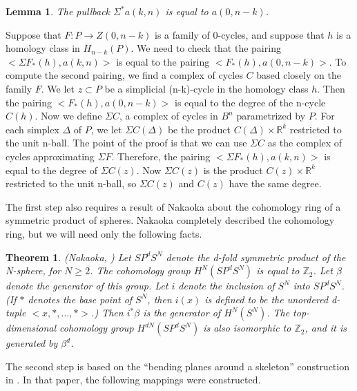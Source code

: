 \documentclass{amsart}
\newtheorem*{reftheorem}{Theorem}
\newtheorem*{Theorem 1}{Theorem 1}
\newtheorem*{Theorem 2}{Theorem 2}
\newtheorem*{Theorem 1A}{Theorem 1A}
\newtheorem*{Theorem 2A}{Theorem 2A}
\newtheorem{lemma}{Lemma}[section]
\newtheorem*{vanishing lemma}{Vanishing Lemma}
\numberwithin{equation}{section}
\begin{document}
\begin{lemma} The pullback $\Sigma^* a(k,n)$ is equal to $a(0,n-k)$.
\end{lemma}

\proof Suppose that $F: P \rightarrow Z(0,n-k)$ is a family of 0-cycles, and
suppose that $h$ is a homology class in $H_{n-k}(P)$.  We
need to check that the pairing $<\Sigma F_*(h), a(k,n)>$ is equal to the pairing
$<F_*(h), a(0,n-k)>$.  To compute
the second pairing, we find a complex of cycles $C$ based closely on the family
$F$.  We let $z \subset P$ be a simplicial (n-k)-cycle in the homology class $h$.  Then
the pairing $<F_*(h), a(0,n-k)>$ is equal to the degree of the n-cycle $C(h)$.
Now we define $\Sigma C$, a complex of cycles in $B^n$ parametrized by $P$.  For each
simplex $\Delta$ of $P$, we let $\Sigma C(\Delta)$ be the product $C(\Delta) \times \mathbb{R}^k$
restricted to the unit n-ball.  The point of the proof is that
we can use $\Sigma C$ as the complex of cycles approximating $\Sigma F$.  Therefore,
the pairing $<\Sigma F_*(h), a(k,n)>$ is equal to the degree of $\Sigma C(z)$.  Now
$\Sigma C(z)$ is the product $C(z) \times \mathbb{R}^k$ restricted to the unit n-ball,
so $\Sigma C(z)$ and $C(z)$ have the same degree. \endproof

The first step also 
requires a result of Nakaoka about the cohomology ring of a symmetric
product of spheres.  Nakaoka completely described the cohomology ring, but we
will need only the following facts.

\begin{reftheorem} (Nakaoka, \cite{N}) Let $SP^d S^N$ denote the d-fold symmetric product
of the N-sphere, for $N \ge 2$.  The cohomology group 
$H^N(SP^d S^N)$ is equal to $\mathbb{Z}_2$.
Let $\beta$ denote the generator of this group.  Let $i$ denote the inclusion
of $S^N$ into $SP^d S^N$.  (If $*$ denotes the base point of $S^N$, then $i(x)$ is
defined to be the unordered d-tuple $<x, *, ..., *>$.)  Then $i^* \beta$ is the
generator of $H^N(S^N)$.  The top-dimensional cohomology group $H^{dN} (SP^d S^N)$ is
also isomorphic to $\mathbb{Z}_2$, and it is generated by $\beta^d$.
\end{reftheorem}

The second step is based on the ``bending planes around a
skeleton'' construction in
\cite{Gu1}.  In that paper, the following mappings were constructed.
\end{document}
